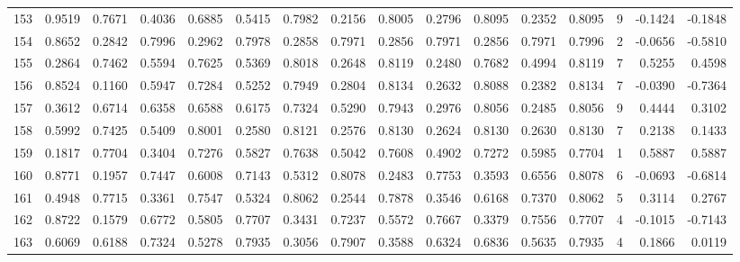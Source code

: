 \begin{tabular}{lrrrrrrrrrrrrrrr}
153 &      0.9519 &  0.7671 &  0.4036 &  0.6885 &  0.5415 &  0.7982 &  0.2156 &  0.8005 &  0.2796 &  0.8095 &   0.2352 &     0.8095 &      9 &                   -0.1424 &                    -0.1848 \\
154 &      0.8652 &  0.2842 &  0.7996 &  0.2962 &  0.7978 &  0.2858 &  0.7971 &  0.2856 &  0.7971 &  0.2856 &   0.7971 &     0.7996 &      2 &                   -0.0656 &                    -0.5810 \\
155 &      0.2864 &  0.7462 &  0.5594 &  0.7625 &  0.5369 &  0.8018 &  0.2648 &  0.8119 &  0.2480 &  0.7682 &   0.4994 &     0.8119 &      7 &                    0.5255 &                     0.4598 \\
156 &      0.8524 &  0.1160 &  0.5947 &  0.7284 &  0.5252 &  0.7949 &  0.2804 &  0.8134 &  0.2632 &  0.8088 &   0.2382 &     0.8134 &      7 &                   -0.0390 &                    -0.7364 \\
157 &      0.3612 &  0.6714 &  0.6358 &  0.6588 &  0.6175 &  0.7324 &  0.5290 &  0.7943 &  0.2976 &  0.8056 &   0.2485 &     0.8056 &      9 &                    0.4444 &                     0.3102 \\
158 &      0.5992 &  0.7425 &  0.5409 &  0.8001 &  0.2580 &  0.8121 &  0.2576 &  0.8130 &  0.2624 &  0.8130 &   0.2630 &     0.8130 &      7 &                    0.2138 &                     0.1433 \\
159 &      0.1817 &  0.7704 &  0.3404 &  0.7276 &  0.5827 &  0.7638 &  0.5042 &  0.7608 &  0.4902 &  0.7272 &   0.5985 &     0.7704 &      1 &                    0.5887 &                     0.5887 \\
160 &      0.8771 &  0.1957 &  0.7447 &  0.6008 &  0.7143 &  0.5312 &  0.8078 &  0.2483 &  0.7753 &  0.3593 &   0.6556 &     0.8078 &      6 &                   -0.0693 &                    -0.6814 \\
161 &      0.4948 &  0.7715 &  0.3361 &  0.7547 &  0.5324 &  0.8062 &  0.2544 &  0.7878 &  0.3546 &  0.6168 &   0.7370 &     0.8062 &      5 &                    0.3114 &                     0.2767 \\
162 &      0.8722 &  0.1579 &  0.6772 &  0.5805 &  0.7707 &  0.3431 &  0.7237 &  0.5572 &  0.7667 &  0.3379 &   0.7556 &     0.7707 &      4 &                   -0.1015 &                    -0.7143 \\
163 &      0.6069 &  0.6188 &  0.7324 &  0.5278 &  0.7935 &  0.3056 &  0.7907 &  0.3588 &  0.6324 &  0.6836 &   0.5635 &     0.7935 &      4 &                    0.1866 &                     0.0119 \\

\end{tabular}
